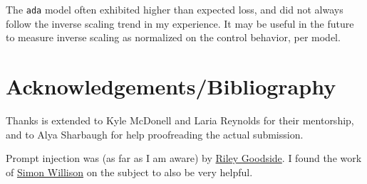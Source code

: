 \documentclass[
]{article}
\begin{document}
The \texttt{ada} model often exhibited higher than expected loss, and
did not always follow the inverse scaling trend in my experience. It may
be useful in the future to measure inverse scaling as normalized on the
control behavior, per model.

\hypertarget{acknowledgementsbibliography}{%
\section{Acknowledgements/Bibliography}\label{acknowledgementsbibliography}}

Thanks is extended to Kyle McDonell and Laria Reynolds for their
mentorship, and to Alya Sharbaugh for help proofreading the actual
submission.

Prompt injection was (as far as I am aware) by
\href{https://twitter.com/goodside/status/1569128808308957185}{Riley
Goodside}. I found the work of
\href{https://simonwillison.net/2022/Sep/12/prompt-injection/}{Simon
Willison} on the subject to also be very helpful.

\printbibliography
\end{document}
